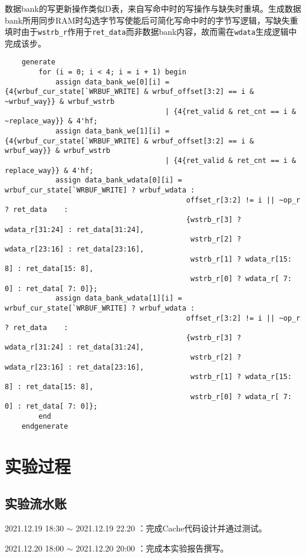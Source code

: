 \documentclass[UTF-8,twoside,c5size]{ctexart}
\begin{document}
    数据bank的写更新操作类似D表，来自写命中时的写操作与缺失时重填。生成数据bank所用同步RAM时勾选字节写使能后可简化写命中时的字节写逻辑，写缺失重填时由于\texttt{wstrb\_r}作用于\texttt{ret\_data}而非数据bank内容，故而需在\texttt{wdata}生成逻辑中完成该步。
    \begin{verbatim}
    generate
        for (i = 0; i < 4; i = i + 1) begin
            assign data_bank_we[0][i] = {4{wrbuf_cur_state[`WRBUF_WRITE] & wrbuf_offset[3:2] == i & ~wrbuf_way}} & wrbuf_wstrb
                                      | {4{ret_valid & ret_cnt == i & ~replace_way}} & 4'hf;
            assign data_bank_we[1][i] = {4{wrbuf_cur_state[`WRBUF_WRITE] & wrbuf_offset[3:2] == i &  wrbuf_way}} & wrbuf_wstrb
                                      | {4{ret_valid & ret_cnt == i &  replace_way}} & 4'hf;
            assign data_bank_wdata[0][i] = wrbuf_cur_state[`WRBUF_WRITE] ? wrbuf_wdata :
                                           offset_r[3:2] != i || ~op_r   ? ret_data    :
                                           {wstrb_r[3] ? wdata_r[31:24] : ret_data[31:24],
                                            wstrb_r[2] ? wdata_r[23:16] : ret_data[23:16],
                                            wstrb_r[1] ? wdata_r[15: 8] : ret_data[15: 8],
                                            wstrb_r[0] ? wdata_r[ 7: 0] : ret_data[ 7: 0]};
            assign data_bank_wdata[1][i] = wrbuf_cur_state[`WRBUF_WRITE] ? wrbuf_wdata :
                                           offset_r[3:2] != i || ~op_r   ? ret_data    :
                                           {wstrb_r[3] ? wdata_r[31:24] : ret_data[31:24],
                                            wstrb_r[2] ? wdata_r[23:16] : ret_data[23:16],
                                            wstrb_r[1] ? wdata_r[15: 8] : ret_data[15: 8],
                                            wstrb_r[0] ? wdata_r[ 7: 0] : ret_data[ 7: 0]};
        end
    endgenerate
    \end{verbatim}

	\section{实验过程}
	
	\subsection{实验流水账}
	2021.12.19 18:30 $\sim$ 2021.12.19 22.20 ：完成Cache代码设计并通过测试。
    
    2021.12.20 18:00 $\sim$ 2021.12.20 20:00 ：完成本实验报告撰写。
	
\end{document}
